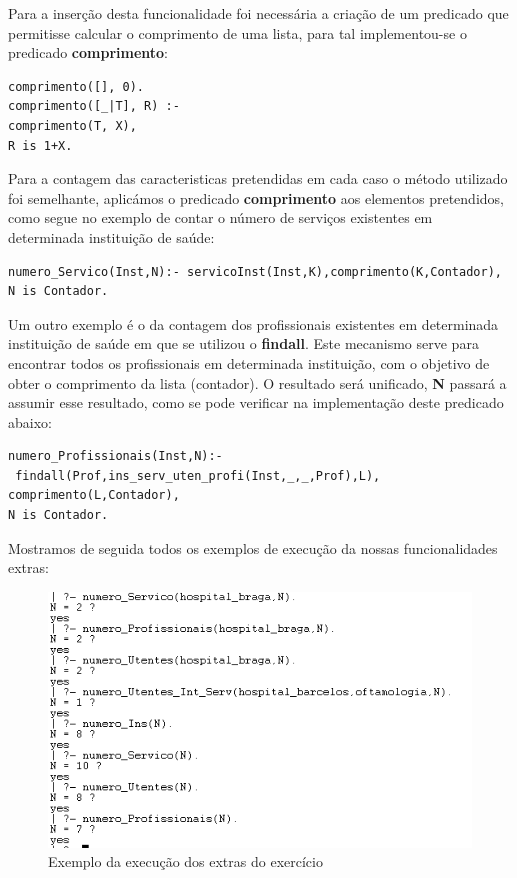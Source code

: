 Para a inserção desta funcionalidade foi necessária a criação de um predicado que permitisse calcular o comprimento de uma lista, para tal implementou-se o predicado \textbf{comprimento}:
\begin{Verbatim}
comprimento([], 0).
comprimento([_|T], R) :-
comprimento(T, X),
R is 1+X.
\end{Verbatim}

Para a contagem das caracteristicas pretendidas em cada caso o método utilizado foi semelhante, aplicámos o predicado \textbf{comprimento} aos elementos pretendidos, como segue no exemplo de contar o número de serviços existentes em determinada instituição de saúde: 

\begin{Verbatim}
numero_Servico(Inst,N):- servicoInst(Inst,K),comprimento(K,Contador), 
N is Contador.
\end{Verbatim}

Um outro exemplo é o da contagem dos profissionais existentes em determinada instituição de saúde em que se utilizou o \textbf{findall}. Este mecanismo serve para encontrar todos os profissionais em determinada instituição, com o objetivo de obter o comprimento da lista (contador). O resultado será unificado,  \textbf{N} passará a assumir esse resultado, como se pode verificar na implementação deste predicado abaixo:  

\begin{Verbatim}
numero_Profissionais(Inst,N):-
 findall(Prof,ins_serv_uten_profi(Inst,_,_,Prof),L),
comprimento(L,Contador), 
N is Contador.
\end{Verbatim}

Mostramos de seguida todos os exemplos de execução da nossas funcionalidades extras: 
\begin{figure}[<+htpb+>]
	\centering
	\includegraphics[scale=0.9]{extras.png}
	\caption{Exemplo da execução dos extras do exercício}
	\label{p3:fig:output10}
\end{figure}


